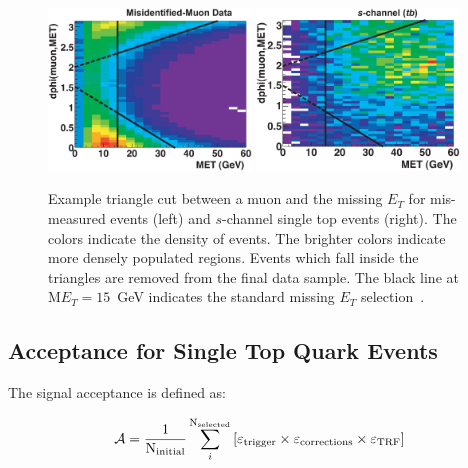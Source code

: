 \begin{figure}[!h!tbp]
\begin{center}
\includegraphics[width=0.48\textwidth]{eps/Reco/TriangleExample.eps}
\includegraphics[width=0.48\textwidth]{eps/Reco/TriangleExampleSignal.eps}
\end{center}
\vspace{-0.1in}
\caption{Example triangle cut between a muon and the missing $E_{T}$ for mis-measured events (left) and $s$-channel single top events (right). The colors indicate the density of events. The brighter colors indicate more densely populated regions. Events which fall inside the triangles are removed from the final data sample. The black line at M$E_{T}=15$~GeV indicates the standard missing $E_{T}$ selection~\cite{oldsingletopnote}.} 
\label{triangleexample}
\end{figure}

\subsection{Acceptance for Single Top Quark Events}
\label{acceptance}

The signal acceptance is defined as:

\begin{equation}
\mathcal{A} = \frac{1}{\rm{N}_{\rm initial}}
\sum_{i}^{\rm{N}_{\rm selected}} \left[ \varepsilon_{\rm trigger} \times
\varepsilon_{\rm corrections} \times \varepsilon_{\rm TRF} \right]
\end{equation}

